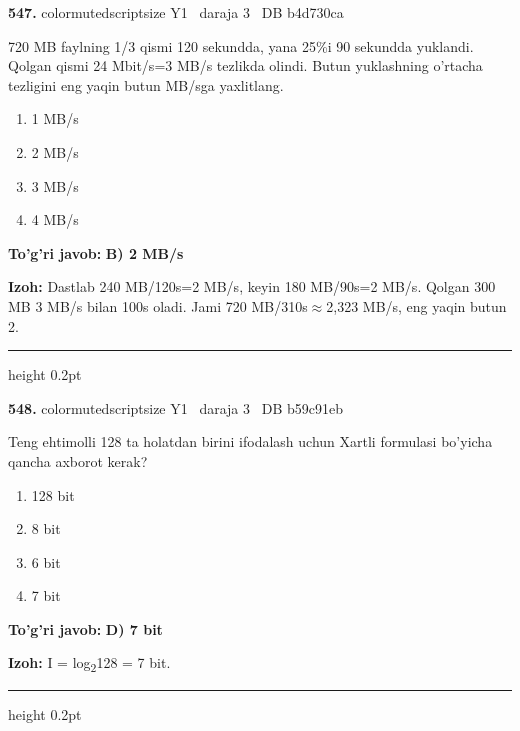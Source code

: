 \documentclass[10pt,a4paper,oneside]{article}
\begin{document}
\noindent\textbf{\color{ink}547.}  {color{muted}scriptsize Y1 \textbullet\ daraja 3 \textbullet\ DB b4d730ca}
\par
720 MB faylning 1/3 qismi 120 sekundda, yana 25\%i 90 sekundda yuklandi. Qolgan qismi 24 Mbit/s=3 MB/s tezlikda olindi. Butun yuklashning o'rtacha tezligini eng yaqin butun MB/sga yaxlitlang.
\begin{enumerate}[label=\Alph*),leftmargin=9mm]
\item 1 MB/s
\item 2 MB/s
\item 3 MB/s
\item 4 MB/s
\end{enumerate}
\begin{tcolorbox}[enhanced,breakable,colback=teal!4,colframe=teal!50!black,boxrule=0.5pt,arc=1.1mm,left=3mm,right=3mm,top=1.7mm,bottom=1.7mm,before skip=2mm,after skip=2mm]
\textbf{\color{teal}To'g'ri javob:} \textbf{B) 2 MB/s}
\par\smallskip
\textbf{Izoh:} Dastlab 240 MB/120s=2 MB/s, keyin 180 MB/90s=2 MB/s. Qolgan 300 MB 3 MB/s bilan 100s oladi. Jami 720 MB/310s\ensuremath{\approx}2,323 MB/s, eng yaqin butun 2.
\end{tcolorbox}
\vspace{2mm}\hrule height 0.2pt \vspace{3mm}

\noindent\textbf{\color{ink}548.}  {color{muted}scriptsize Y1 \textbullet\ daraja 3 \textbullet\ DB b59c91eb}
\par
Teng ehtimolli 128 ta holatdan birini ifodalash uchun Xartli formulasi bo'yicha qancha axborot kerak?
\begin{enumerate}[label=\Alph*),leftmargin=9mm]
\item 128 bit
\item 8 bit
\item 6 bit
\item 7 bit
\end{enumerate}
\begin{tcolorbox}[enhanced,breakable,colback=teal!4,colframe=teal!50!black,boxrule=0.5pt,arc=1.1mm,left=3mm,right=3mm,top=1.7mm,bottom=1.7mm,before skip=2mm,after skip=2mm]
\textbf{\color{teal}To'g'ri javob:} \textbf{D) 7 bit}
\par\smallskip
\textbf{Izoh:} I = log\textsubscript{2}128 = 7 bit.
\end{tcolorbox}
\vspace{2mm}\hrule height 0.2pt \vspace{3mm}
\end{document}
